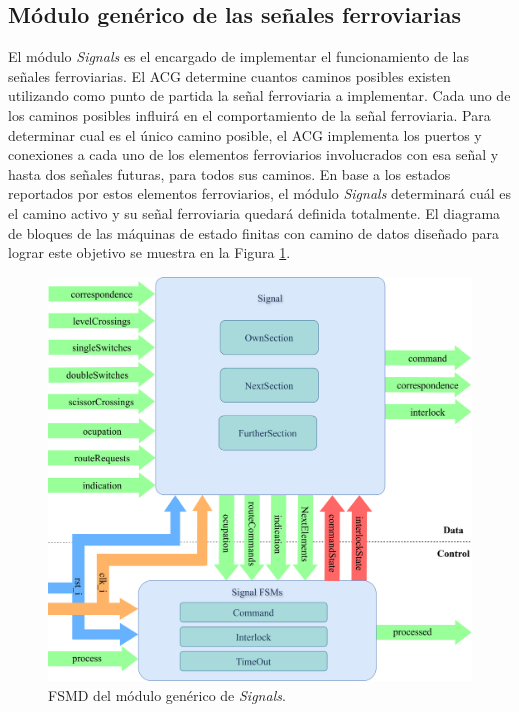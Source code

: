 \subsection{Módulo genérico de las señales ferroviarias}
	\label{sec:ACG_sig}
	
	El módulo \textit{Signals} es el encargado de implementar el funcionamiento de las señales ferroviarias. El ACG determine cuantos caminos posibles existen utilizando como punto de partida la señal ferroviaria a implementar. Cada uno de los caminos posibles influirá en el comportamiento de la señal ferroviaria. Para determinar cual es el único camino posible, el ACG implementa los puertos y conexiones a cada uno de los elementos ferroviarios involucrados con esa señal y hasta dos señales futuras, para todos sus caminos. En base a los estados reportados por estos elementos ferroviarios, el módulo \textit{Signals} determinará cuál es el camino activo y su señal ferroviaria quedará definida totalmente. El diagrama de bloques de las máquinas de estado finitas con camino de datos diseñado para lograr este objetivo se muestra en la Figura \ref{fig:SIG_module}.
	
	\begin{figure}[H]
		\centering
		\includegraphics[width=1\textwidth]{Figuras/SIG_module}
		\centering\caption{FSMD del módulo genérico de \textit{Signals}.}
		\label{fig:SIG_module}
	\end{figure}
	
